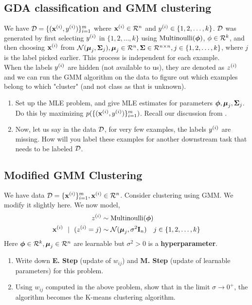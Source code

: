 \subsection{GDA classification and GMM clustering}
We have $\mathcal{D} = \{(\mathbf{x}^{(i)}, y^{(i)})\}_{i = 1}^{m}$ where $\mathbf{x}^{(i)} \in \mathcal{R}^n$ and $y^{(i)} \in \{1, 2, \dots, k\}$. $\mathcal{D}$ was generated by first selecting $y^{(i)}$ in $\{1, 2, \dots, k\}$ using $\text{Multinoulli}(\boldsymbol{\phi})$, $\phi \in \mathcal{R}^{k}$, and then choosing $\mathbf{x}^{(i)}$ from $\mathcal{N}(\boldsymbol{\mu}_j, \boldsymbol{\Sigma}_j), \boldsymbol{\mu}_j \in \mathcal{R}^n, \boldsymbol{\Sigma} \in \mathcal{R}^{n \times n}, j \in \{1, 2, \dots, k\}$, where $j$ is the label picked earlier. This process is independent for each example.\\

When the labels $y^{(i)}$ are hidden (not available to us), they are denoted as $z^{(i)}$ and we can run the GMM algorithm on the data to figure out which examples belong to which "cluster" (and not class as that is unknown).

\begin{enumerate}[label=\alph*)]
\item Set up the MLE problem, and give MLE estimates for parameters $\boldsymbol{\phi}, \boldsymbol{\mu}_j, \boldsymbol{\Sigma}_j$. Do this by maximizing $p(\{(\mathbf{x}^{(i)}, y^{(i)})\}_{i = 1}^{m})$. Recall our discussion from .
\item Now, let us say in the data $\mathcal{D}$, for very few examples, the labels $y^{(i)}$ are missing. How will you label these examples for another downstream task that needs to be labeled $\mathcal{D}$.
\end{enumerate}


\subsection{Modified GMM Clustering}
We have data $\mathcal{D} = \{\mathbf{x}^{(i)}\}_{i = 1}^{m}, \mathbf{x}^{(i)} \in \mathcal{R}^n$. Consider clustering using GMM. We modify it slightly here. We now model,
\begin{align*}
    z^{(i)} &\sim \text{Multinoulli}(\boldsymbol{\phi})\\
    \mathbf{x}^{(i)} \ \ | \ \ (z^{(i)} = j) &\sim \mathcal{N}(\boldsymbol{\mu}_j, \sigma^2 \mathbf{I}_n) \quad j \in \{1, 2, \dots, k\}
\end{align*}
Here $\boldsymbol{\phi} \in \mathcal{R}^k, \boldsymbol{\mu}_j \in \mathcal{R}^n$ are learnable but $\sigma^2 > 0$ is a \textbf{hyperparameter}.
\begin{enumerate}[label=\alph*)]
\item Write down \textbf{E. Step} (update of $w_{ij}$) and \textbf{M. Step} (update of learnable parameters) for this problem.

\item Using $w_{ij}$ computed in the above problem, show that in the limit $\sigma \to 0^{+}$, the algorithm becomes the K-means  clustering algorithm.
\end{enumerate}